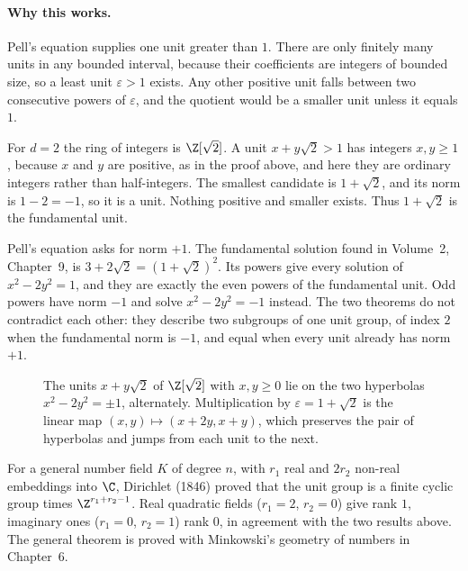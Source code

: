 \paragraph{Why this works.}
Pell's equation supplies one unit greater than $1$. There are only finitely many units in any bounded interval, because their coefficients are integers of bounded size, so a least unit $\varepsilon>1$ exists. Any other positive unit falls between two consecutive powers of $\varepsilon$, and the quotient would be a smaller unit unless it equals $1$.

\begin{examplex}
For $d=2$ the ring of integers is $\Z[\sqrt2]$. A unit $x+y\sqrt2>1$ has integers $x,y\ge1$, because $x$ and $y$ are positive, as in the proof above, and here they are ordinary integers rather than half-integers. The smallest candidate is $1+\sqrt2$, and its norm is $1-2=-1$, so it is a unit. Nothing positive and smaller exists. Thus $1+\sqrt2$ is the fundamental unit.

Pell's equation asks for norm $+1$. The fundamental solution found in Volume~2, Chapter~9, is $3+2\sqrt2=(1+\sqrt2)^2$. Its powers give every solution of $x^2-2y^2=1$, and they are exactly the even powers of the fundamental unit. Odd powers have norm $-1$ and solve $x^2-2y^2=-1$ instead. The two theorems do not contradict each other: they describe two subgroups of one unit group, of index $2$ when the fundamental norm is $-1$, and equal when every unit already has norm $+1$.
\end{examplex}

\begin{figure}[ht]
\centering
{}
\caption{The units $x+y\sqrt2$ of $\Z[\sqrt2]$ with $x,y\ge0$ lie on the two hyperbolas $x^2-2y^2=\pm1$, alternately. Multiplication by $\varepsilon=1+\sqrt2$ is the linear map $(x,y)\mapsto(x+2y,x+y)$, which preserves the pair of hyperbolas and jumps from each unit to the next.}
\label{fig:units}
\end{figure}

\begin{remark}
For a general number field $K$ of degree $n$, with $r_1$ real and $2r_2$ non-real embeddings into $\C$, Dirichlet (1846) proved that the unit group is a finite cyclic group times $\Z^{r_1+r_2-1}$. Real quadratic fields ($r_1=2$, $r_2=0$) give rank $1$, imaginary ones ($r_1=0$, $r_2=1$) rank $0$, in agreement with the two results above. The general theorem is proved with Minkowski's geometry of numbers in Chapter~6.
\end{remark}

